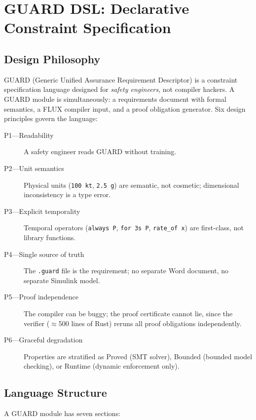 \documentclass[sigplan,10pt,review]{acmart}
\begin{document}
\section{GUARD DSL: Declarative Constraint Specification}
\label{sec:guard}

\subsection{Design Philosophy}

GUARD (Generic Unified Assurance Requirement Descriptor) is a constraint
specification language designed for \emph{safety engineers}, not compiler hackers.
A GUARD module is simultaneously: a requirements document with formal semantics,
a FLUX compiler input, and a proof obligation generator. Six design principles
govern the language:

\begin{description}
  \item[P1---Readability] A safety engineer reads GUARD without training.
  \item[P2---Unit semantics] Physical units (\texttt{100 kt}, \texttt{2.5 g}) are
    semantic, not cosmetic; dimensional inconsistency is a type error.
  \item[P3---Explicit temporality] Temporal operators (\texttt{always P},
    \texttt{for 3s P}, \texttt{rate\_of x}) are first-class, not library functions.
  \item[P4---Single source of truth] The \texttt{.guard} file is the requirement;
    no separate Word document, no separate Simulink model.
  \item[P5---Proof independence] The compiler can be buggy; the proof certificate
    cannot lie, since the verifier ($\approx$500 lines of Rust) reruns all proof
    obligations independently.
  \item[P6---Graceful degradation] Properties are stratified as Proved (SMT
    solver), Bounded (bounded model checking), or Runtime (dynamic enforcement only).
\end{description}

\subsection{Language Structure}

A GUARD module has seven sections:
\end{document}
